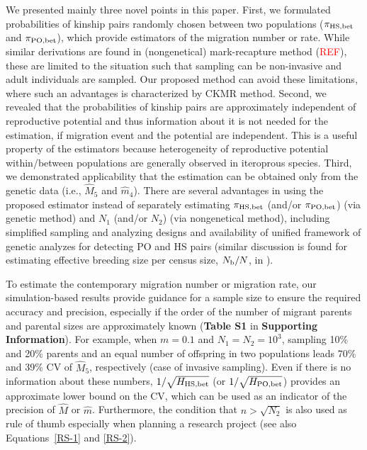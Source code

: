 \documentclass[12pt, English]{article}
\def\RED#1{\textcolor{red}{#1}} %
\begin{document}
\begin{spacing}{1.9}
We presented mainly three novel points in this paper. First, we formulated probabilities of kinship pairs randomly chosen between two populations ($\pi_{\rm HS,bet}$ and $\pi_{\rm PO,bet}$), which provide estimators of the migration number or rate. While similar derivations are found in (nongenetical) mark-recapture method (\RED{REF}), these are limited to the situation such that sampling can be non-invasive and adult individuals are sampled. Our proposed method can avoid these limitations, where such an advantages is characterized by CKMR method. Second, we revealed that the probabilities of kinship pairs are approximately independent of reproductive potential and thus information about it is not needed for the estimation, if migration event and the potential are independent. This is a useful property of the estimators because heterogeneity of reproductive potential within/between populations are generally observed in iteroprous species. Third, we demonstrated applicability that the estimation can be obtained only from the genetic data (i.e., ${\hat M_5}$ and ${\hat m_4}$). There are several advantages in using the proposed estimator instead of separately estimating $\pi_{\rm HS,bet}$ (and/or $\pi_{\rm PO,bet}$) (via genetic method) and $N_1$ (and/or $N_2$) (via nongenetical method), including simplified sampling and analyzing designs and availability of unified framework of genetic analyzes for detecting PO and HS pairs (similar discussion is found for estimating effective breeding size per census size, $N_{\rm b}/N$, in \cite{Akita_2020}). 

To estimate the contemporary migration number or migration rate, our simulation-based results provide guidance for a sample size to ensure the required accuracy and precision, especially if the order of the number of migrant parents and parental sizes are approximately known ({\bf Table S1} in {\bf Supporting Information}). For example, when $m=0.1$ and $N_1=N_2=10^3$, sampling 10\% and 20\% parents and an equal number of offspring in two populations leads 70\% and 39\% CV of ${\hat M_5}$, respectively (case of invasive sampling). Even if there is no information about these numbers, $1/\sqrt{H_{\rm HS, bet}}$ (or $1/\sqrt{H_{\rm PO, bet}}$) provides an approximate lower bound on the CV, which can be used as an indicator of the precision of ${\hat M}$ or ${\hat m}$. Furthermore, the condition that $n>\sqrt{N_2}$ is also used as rule of thumb especially when planning a research project (see also Equations~\ref{RS-1} and \ref{RS-2}). 


\end{spacing}
\end{document}
